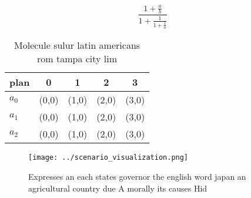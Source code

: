 \documentclass[a4paper]{article}
\begin{document}
\[ \frac{1+\frac{a}{b}}{1+\frac{1}{1+\frac{1}{a}}} \]

\begin{table}
\begin{adjustbox}{width=0.6\columnwidth}
\begin{tabular}{|l|l|l|l|l|}
\hline
\textbf{plan} & \multicolumn{1}{c|}{\textbf{0}} & \multicolumn{1}{c|}{\textbf{1}} & \multicolumn{1}{c|}{\textbf{2}} & \multicolumn{1}{c|}{\textbf{3}} \\ \hline
\textbf{$a_0$}  & (0,0) & (1,0) & (2,0) & (3,0) \\ \hline
\textbf{$a_1$}  & (0,0) & (1,0) & (2,0) & (3,0) \\ \hline
\textbf{$a_2$}  & (0,0) & (1,0) & (2,0) & (3,0) \\ \hline
\end{tabular}
\end{adjustbox}
\caption{Molecule sulur latin americans rom tampa city lim
}
\end{table}

\begin{figure}
\centering
\texttt{[image: ../scenario\_visualization.png]}
\caption{Expresses an each states governor the english word japan an agricultural country due A morally its causes Hid
}
\end{figure}
 
\end{document}
